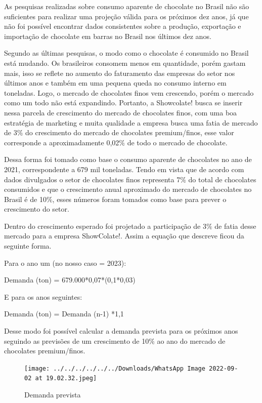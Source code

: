 \documentclass[
	12pt,				%
	openright,			%
	oneside,			%
	a4paper,			%
	english,			%
	french,				%
	spanish,			%
	brazil				%
	]{abntex2}
\begin{document}
As pesquisas realizadas sobre consumo aparente de chocolate no Brasil não são suficientes para realizar uma projeção válida para os próximos dez anos, já que não foi possível encontrar dados consistentes sobre a produção, exportação e importação de chocolate em barras no Brasil nos últimos dez anos.

Segundo as últimas pesquisas, o modo como o chocolate é consumido no Brasil está mudando. Os brasileiros consomem menos em quantidade, porém gastam mais, isso se reflete no aumento do faturamento das empresas do setor nos últimos anos e também em uma pequena queda no consumo interno em toneladas. Logo, o mercado de chocolates finos vem crescendo, porém o mercado como um todo não está expandindo. Portanto, a Showcolate! busca se inserir nessa parcela de crescimento do mercado de chocolates finos, com uma boa estratégia de marketing e muita qualidade a empresa busca uma fatia de mercado de 3$\%$ do crescimento do mercado de chocolates premium/finos, esse valor corresponde a aproximadamente 0,02$\%$ de todo o mercado de chocolate.

Dessa forma foi tomado como base o consumo aparente de chocolates no ano de 2021, correspondente a 679 mil toneladas. Tendo em vista que de acordo com dados divulgados o setor de chocolates finos representa 7$\%$ do total de chocolates consumidos e que o crescimento anual aproximado do mercado de chocolates no Brasil é de 10$\%$, esses números foram tomados como base para prever o crescimento do setor. \cite{c2-1} \cite{c2-2} \cite{4}

Dentro do crescimento esperado foi projetado a participação de 3$\%$ de fatia desse mercado para a empresa ShowColate!. Assim a equação que descreve ficou da seguinte forma.

Para o ano um (no nosso caso = 2023):

Demanda (ton) = 679.000*0,07*(0,1*0,03)

E para os anos seguintes:

Demanda (ton) = Demanda (n-1) *1,1

Desse modo foi possível calcular a demanda prevista para os próximos anos seguindo as previsões de um crescimento de 10$\%$ ao ano do mercado de chocolates premium/finos.

\begin{figure}[H]
\begin{center}
\caption{Demanda prevista}
\texttt{[image: ../../../../../../Downloads/WhatsApp Image 2022-09-02 at 19.02.32.jpeg]} 
\end{center}
\end{figure}
\end{document}
